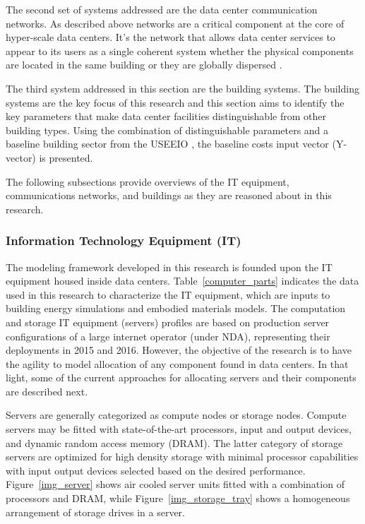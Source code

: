     The second set of systems addressed are the data center communication networks. As described above networks are a critical component at the core of hyper-scale data centers. It's the network that allows data center services to appear to its users as a single coherent system whether the physical components are located in the same building or they are globally dispersed \cite{tanenbaum}.
    
    The third system addressed in this section are the building systems. The building systems are the key focus of this research and this section aims to identify the key parameters that make data center facilities distinguishable from other building types. Using the combination of distinguishable parameters and a baseline building sector from the USEEIO \cite{yang17}, the baseline costs input vector (Y-vector) is presented.
    
    The following subsections provide overviews of the IT equipment, communications networks, and buildings as they are reasoned about in this research.
    
        \subsubsection{Information Technology Equipment (IT)}
            The modeling framework developed in this research is founded upon the IT equipment housed inside data centers. Table~\ref{computer_parts} indicates the data used in this research to characterize the IT equipment, which are inputs to building energy simulations and embodied materials models. The computation and storage IT equipment (servers) profiles are based on production server configurations of a large internet operator (under NDA), representing their deployments in 2015 and 2016. However, the objective of the research is to have the agility to model allocation of any component found in data centers. In that light, some of the current approaches for allocating servers and their components are described next.
            
            Servers are generally categorized as compute nodes or storage nodes. Compute servers may be fitted with state-of-the-art processors, input and output devices, and dynamic random access memory (DRAM). The latter category of storage servers are optimized for high density storage with minimal processor capabilities with input output devices selected based on the desired performance. Figure~\ref{img_server} shows air cooled server units fitted with a combination of processors and DRAM, while Figure~\ref{img_storage_tray} shows a homogeneous arrangement of storage drives in a server. 
             
            
            
